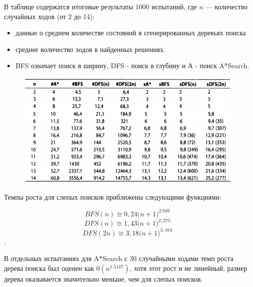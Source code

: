 \documentclass{beamer}
\begin{document}
\begin{frame}
В таблице содержатся итоговые результаты 1000 испытаний, где $n$ — количество случайных ходов (от 2 до 14): 
\begin{itemize}
\item данные о среднем количестве состояний в сгенерированных деревьях поиска 
\item среднее количество ходов в найденных решениях. 
\item BFS означает поиск в ширину, DFS - поиск в глубину и А - поиск A*Search.
\end{itemize}
\begin{figure}[h]
\centering
\includegraphics[scale=0.5]{images/lec06-pic17.png}
\end{figure}
\end{frame}

\begin{frame}
Темпы роста для слепых поисков приближены следующими функциями: 

\[BFS(n) \cong 0,24\dot (n+1)^{2.949}\]
\[DFS(n) \cong 1,43\dot (n+1)^{2,275}\]
\[DFS(2n) \cong 3,18\dot (n+1)^{3,164}\].

В отдельных испытаниях для A*Search с 30 случайными ходами темп роста дерева поиска был оценен как $0(n^{1.5147})$, хотя этот рост и не линейный, размер дерева оказывается значительно меньше, чем для слепых поисков.
\end{frame}
\end{document}
